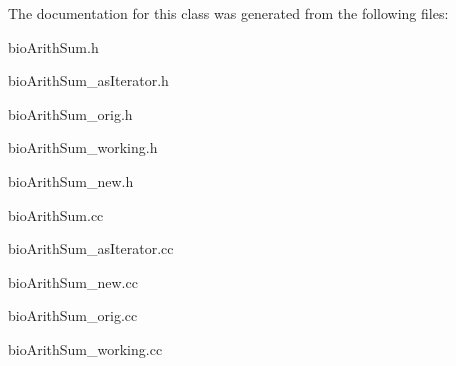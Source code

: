 The documentation for this class was generated from the following files\+:\begin{DoxyCompactItemize}
\item 
bio\+Arith\+Sum.\+h\item 
bio\+Arith\+Sum\+\_\+as\+Iterator.\+h\item 
bio\+Arith\+Sum\+\_\+orig.\+h\item 
bio\+Arith\+Sum\+\_\+working.\+h\item 
bio\+Arith\+Sum\+\_\+new.\+h\item 
bio\+Arith\+Sum.\+cc\item 
bio\+Arith\+Sum\+\_\+as\+Iterator.\+cc\item 
bio\+Arith\+Sum\+\_\+new.\+cc\item 
bio\+Arith\+Sum\+\_\+orig.\+cc\item 
bio\+Arith\+Sum\+\_\+working.\+cc\end{DoxyCompactItemize}
